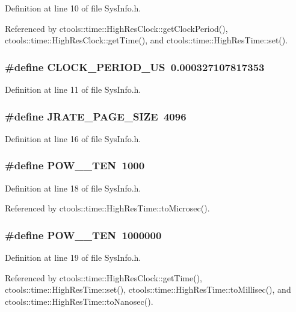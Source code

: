 Definition at line 10 of file Sys\-Info.h.

Referenced by ctools::time::High\-Res\-Clock::get\-Clock\-Period(), ctools::time::High\-Res\-Clock::get\-Time(), and ctools::time::High\-Res\-Time::set().
\subsubsection{\setlength{\rightskip}{0pt plus 5cm}\#define CLOCK\_\-PERIOD\_\-US\ 0.000327107817353}\label{SysInfo_8h_a2}




Definition at line 11 of file Sys\-Info.h.
\subsubsection{\setlength{\rightskip}{0pt plus 5cm}\#define JRATE\_\-PAGE\_\-SIZE\ 4096}\label{SysInfo_8h_a5}




Definition at line 16 of file Sys\-Info.h.
\subsubsection{\setlength{\rightskip}{0pt plus 5cm}\#define POW\_\_\-TEN\ 1000}\label{SysInfo_8h_a6}




Definition at line 18 of file Sys\-Info.h.

Referenced by ctools::time::High\-Res\-Time::to\-Microsec().
\subsubsection{\setlength{\rightskip}{0pt plus 5cm}\#define POW\_\_\-TEN\ 1000000}\label{SysInfo_8h_a7}




Definition at line 19 of file Sys\-Info.h.

Referenced by ctools::time::High\-Res\-Clock::get\-Time(), ctools::time::High\-Res\-Time::set(), ctools::time::High\-Res\-Time::to\-Millisec(), and ctools::time::High\-Res\-Time::to\-Nanosec().
